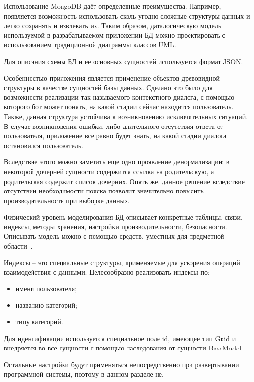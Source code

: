Использование MongoDB даёт определенные преимущества. Например, появляется возможность использовать сколь угодно сложные структуры данных и легко сохранять и извлекать их. Таким образом, даталогическую модель используемой в разрабатываемом приложении БД можно проектировать с использованием традиционной диаграммы классов UML.

Для описания схемы БД и ее основных сущностей используется формат JSON.

Особенностью приложения является применение объектов древовидной структуры в качестве сущностей базы данных. Сделано это было для возможности реализации так называемого контекстного диалога, с помощью которого бот может понять, на какой стадии сейчас находится пользователь. Также, данная структура устойчива к возникновению исключительных ситуаций. В случае возникновения ошибки, либо длительного отсутствия ответа от пользователя, приложение все равно будет знать, на какой стадии диалога остановился пользователь. 

Вследствие этого можно заметить еще одно проявление денормализации: в некоторой дочерней сущности содержится ссылка на родительскую, а родительская содержит список дочерних. Опять же, данное решение вследствие отсутствии необходимости поиска позволит значительно повысить производительность при выборке данных.

Физический уровень моделирования БД описывает конкретные таблицы, связи, индексы, методы хранения, настройки производительности, безопасности. Описывать модель можно с помощью средств, уместных для предметной области~\cite{kulikov_db_workbook}. 

Индексы -- это специальные структуры, применяемые для ускорения операций взаимодействия с данными. Целесообразно реализовать индексы по:

\begin{itemize}
	\item имени пользователя;
	\item названию категорий;
	\item типу категорий.
\end{itemize}

Для идентификации используется специальное поле id, имеющее тип Guid и внедряется во все сущности с помощью наследования от сущности BaseModel.

Остальные настройки будут применяться непосредственно при развертывании программной системы, поэтому в данном разделе не.
